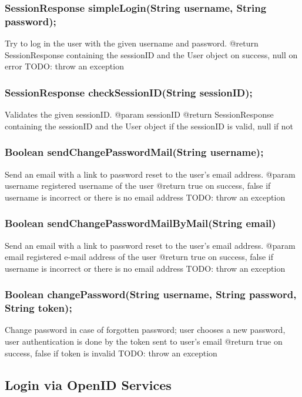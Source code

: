 \subsubsection{SessionResponse simpleLogin(String username, String password);}
Try to log in the user with the given username and password.
@return SessionResponse containing the sessionID and the User object on success, null on error
TODO: throw an exception


\subsubsection{SessionResponse checkSessionID(String sessionID);}
Validates the given sessionID.
@param sessionID
@return SessionResponse containing the sessionID and the User object if the sessionID is valid, null if not


\subsubsection{Boolean sendChangePasswordMail(String username);}
Send an email with a link to password reset
to the user's email address.
@param username registered username of the user
@return true on success, false if username is incorrect or there is no email address
TODO: throw an exception


\subsubsection{Boolean sendChangePasswordMailByMail(String email)}
Send an email with a link to password reset
to the user's email address.
@param email registered e-mail address of the user
@return true on success, false if username is incorrect or there is no email address
TODO: throw an exception

    

\subsubsection{Boolean changePassword(String username, String password, String token);}
Change password in case of forgotten password;
user chooses a new password,
user authentication is done by the token sent to user's email
@return true on success, false if token is invalid
TODO: throw an exception

\subsection{Login via OpenID Services}
\label{subsubsec:gui_openid}

